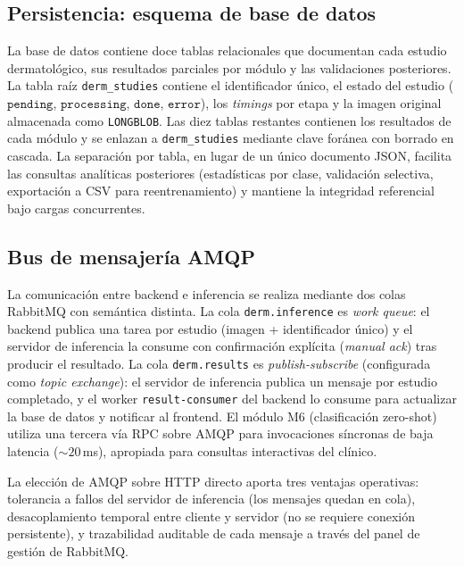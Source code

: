\subsection{Persistencia: esquema de base de datos}
\label{sec:dermapixel-db}

La base de datos contiene doce tablas relacionales que documentan
cada estudio dermatológico, sus resultados parciales por módulo y
las validaciones posteriores. La tabla raíz \texttt{derm\_studies}
contiene el identificador único, el estado del estudio
($\texttt{pending}$, $\texttt{processing}$, $\texttt{done}$,
$\texttt{error}$), los \emph{timings} por etapa y la imagen
original almacenada como \texttt{LONGBLOB}. Las diez tablas
restantes contienen los resultados de cada módulo y se enlazan a
\texttt{derm\_studies} mediante clave foránea con borrado en
cascada. La separación por tabla, en lugar de un único documento
JSON, facilita las consultas analíticas posteriores (estadísticas
por clase, validación selectiva, exportación a CSV para
reentrenamiento) y mantiene la integridad referencial bajo cargas
concurrentes.

\subsection{Bus de mensajería AMQP}
\label{sec:dermapixel-amqp}

La comunicación entre backend e inferencia se realiza mediante dos
colas RabbitMQ con semántica distinta. La cola
\texttt{derm.inference} es \emph{work queue}: el backend publica
una tarea por estudio (imagen + identificador único) y el servidor
de inferencia la consume con confirmación explícita
(\emph{manual ack}) tras producir el resultado. La cola
\texttt{derm.results} es \emph{publish-subscribe} (configurada
como \emph{topic exchange}): el servidor de inferencia publica un
mensaje por estudio completado, y el worker \texttt{result-consumer}
del backend lo consume para actualizar la base de datos y notificar
al frontend. El módulo M6 (clasificación zero-shot) utiliza una
tercera vía RPC sobre AMQP para invocaciones síncronas de baja
latencia ($\sim 20$\,ms), apropiada para consultas
interactivas del clínico.

La elección de AMQP sobre HTTP directo aporta tres ventajas
operativas: tolerancia a fallos del servidor de inferencia (los
mensajes quedan en cola), desacoplamiento temporal entre cliente y
servidor (no se requiere conexión persistente), y trazabilidad
auditable de cada mensaje a través del panel de gestión de
RabbitMQ.

